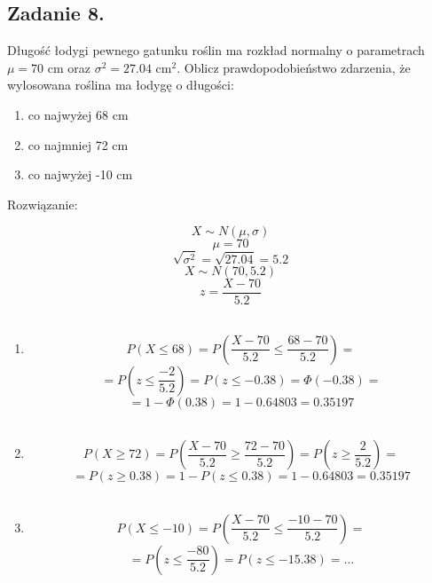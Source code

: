 \subsection{Zadanie 8.}

Długość łodygi pewnego gatunku roślin ma rozkład normalny o parametrach $\mu = 70$ cm oraz $\sigma^2 = 27.04$ $\mbox{cm}^2$.
Oblicz prawdopodobieństwo zdarzenia, że wylosowana roślina ma łodygę o długości:

\begin{enumerate}[label=(\alph*)]
\item co najwyżej 68 cm
\item co najmniej  72 cm
\item co najwyżej -10 cm
\end{enumerate}


Rozwiązanie:

$$ X \sim N ( \mu, \sigma ) $$
$$\mu = 70$$
$$ \sqrt{ \sigma^2 } = \sqrt{27.04} = 5.2 $$
$$ X \sim N ( 70, 5.2 ) $$
$$ z = \frac{X - 70}{5.2} $$ \\

\begin{enumerate}

\item
$$ P( X \le 68 ) = P(  \frac{X - 70}{5.2} \le \frac{68 - 70}{5.2} ) = $$
$$ = P( z \le \frac{-2}{5.2} ) =  P( z \le -0.38 ) = \Phi(-0.38) = $$
$$ = 1 - \Phi(0.38) = 1 - 0.64803 = 0.35197 $$ \\

\item
$$ P( X \ge 72 ) = P( \frac{X - 70}{5.2} \ge \frac{72 - 70}{5.2} ) = P( z \ge \frac{2}{5.2} ) =  $$
$$ = P(z \ge 0.38 ) = 1 - P( z \le 0.38 ) = 1 - 0.64803 = 0.35197 $$ \\

\item
$$ P( X \le -10 ) = P( \frac{X - 70}{5.2} \le \frac{-10 - 70}{5.2} ) = $$
$$ = P( z \le \frac{-80}{5.2} ) = P( z \le -15.38 ) = . . .$$
\end{enumerate}
